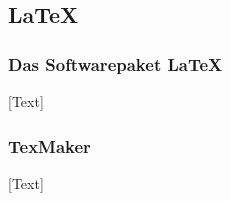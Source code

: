 
\subsection{LaTeX}

\subsubsection{Das Softwarepaket LaTeX}
[Text]

\subsubsection{TexMaker}
[Text]
